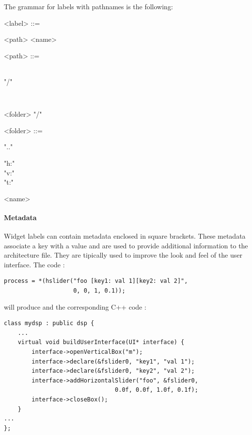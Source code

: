 \documentclass[a4paper]{book}
\begin{document}
The grammar for labels with pathnames is the following:
\begin{grammar}
  <label> ::= 
  \begin{syntdiag}
	<path> <name>
  \end{syntdiag}
\end{grammar}
%
\begin{grammar}
 <path> ::= 
  \begin{syntdiag}
	\begin{stack} \\ "/" \end{stack} 
	\begin{stack} \\ \begin{rep} <folder> "/" \end{rep} \end{stack} 
 \end{syntdiag}
\end{grammar}
%
\begin{grammar}
 <folder> ::= 
  \begin{syntdiag}
	\begin{stack}
		".." \\ 
		\begin{stack} "h:" \\ "v:" \\ "t:" \end{stack} <name>
	\end{stack}
 \end{syntdiag}
\end{grammar}



\paragraph{Metadata}
Widget labels can contain metadata enclosed in square brackets. These metadata associate a key with a value and are used to provide additional information to the architecture file.  They are tipically used to improve the look and feel of the user interface. 
The \faust code :
\begin{lstlisting}
process = *(hslider("foo [key1: val 1][key2: val 2]", 
					0, 0, 1, 0.1));
\end{lstlisting}

will produce and the corresponding C++ code :

\begin{lstlisting}
class mydsp : public dsp {
	...
	virtual void buildUserInterface(UI* interface) {
	    interface->openVerticalBox("m");
	    interface->declare(&fslider0, "key1", "val 1");
	    interface->declare(&fslider0, "key2", "val 2");
	    interface->addHorizontalSlider("foo", &fslider0, 
								0.0f, 0.0f, 1.0f, 0.1f);
	    interface->closeBox();
	}
...
};
\end{lstlisting}
\end{document}
